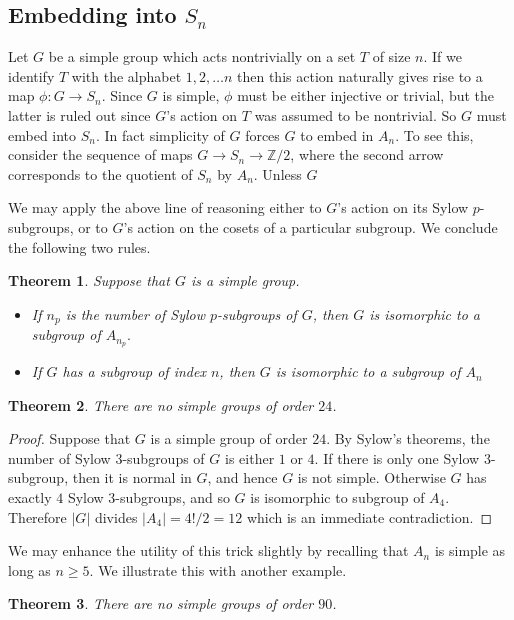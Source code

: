 \documentclass[11pt, oneside]{article}   	%
\newtheorem{theorem}{Theorem}
\begin{document}
\subsection{Embedding into $S_n$}

Let $G$ be a simple group which acts nontrivially on a set $T$ of size $n.$  If we identify $T$ with the alphabet $1,2,\ldots n$ then this action naturally gives rise to a map $\phi: G \rightarrow S_n.$  Since $G$ is simple, $\phi$ must be either injective or trivial, but the latter is ruled out since $G$'s action on $T$ was assumed to be nontrivial.  So $G$ must embed into $S_n$.  In fact simplicity of $G$ forces $G$ to embed in $A_n$.  To see this, consider the sequence of maps $G\rightarrow S_n \rightarrow \mathbb{Z}/2$, where the second arrow corresponds to the quotient of $S_n$ by $A_n.$  Unless $G$ 

We may apply the above line of reasoning either to $G$'s action on its Sylow $p$-subgroups, or to $G$'s action on the cosets of a particular subgroup.  We conclude the following two rules.
\begin{theorem}
Suppose that $G$ is a simple group.
\begin{itemize}
\item If $n_p$ is the number of Sylow $p$-subgroups of $G$, then $G$ is isomorphic to a subgroup of $A_{n_p}.$
\item If $G$ has a subgroup of index $n$, then $G$ is isomorphic to a subgroup of $A_n$
\end{itemize}
\end{theorem}

\begin{theorem}
There are no simple groups of order $24$.
\end{theorem}
\begin{proof}
Suppose that $G$ is a simple group of order $24$.  By Sylow's theorems, the number of Sylow $3$-subgroups of $G$ is either $1$ or $4$.  If there is only one Sylow $3$-subgroup, then it is normal in $G$, and hence $G$ is not simple.  Otherwise $G$ has exactly $4$ Sylow $3$-subgroups, and so $G$ is isomorphic to subgroup of $A_4$.  Therefore $|G|$ divides $|A_4| = 4!/2 = 12$ which is an immediate contradiction.
\end{proof}

We may enhance the utility of this trick slightly by recalling that $A_n$ is simple as long as $n\geq 5.$  We illustrate this with another example.

\begin{theorem}
There are no simple groups of order $90$.
\end{theorem}
\end{document}
